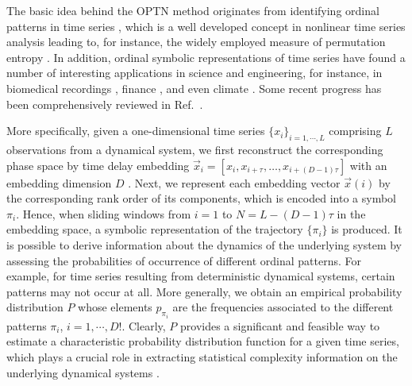 \documentclass[12pt,aip,cha,reprint,nofootinbib]{revtex4-1}
\begin{document}
The basic idea behind the OPTN method originates from identifying ordinal patterns in time series \cite{BandtPRL2002}, which is a well developed concept in nonlinear time series analysis leading to, for instance, the widely employed measure of permutation entropy \cite{BandtPRL2002}. In addition, ordinal symbolic representations of time series have found a number of interesting applications in science and engineering, for instance, in biomedical recordings \cite{AmigoPTRSA2014}, finance \cite{ZaninChaos2008}, and even climate \cite{BarreiroChaos2011}. Some recent progress has been comprehensively reviewed in Ref.~\cite{AmigoPTRSA2014}. 

More specifically, given a one-dimensional time series $\{ x_i\}_{i=1, \cdots, L}$ comprising $L$ observations from a dynamical system, we first reconstruct the corresponding phase space by time delay embedding $\vec{x}_i = [x_i, x_{i+\tau}, \ldots, x_{i+(D-1)\tau}]$ with an embedding dimension $D$ \cite{Takens1981,Kantz97}. Next, we represent each embedding vector $\vec{x}(i)$ by the corresponding rank order of its components, which is encoded into a symbol $\pi_{i}$. Hence, when sliding windows from $i=1$ to $N = L - (D - 1)\tau$ in the embedding space, a symbolic representation of the trajectory $\{\pi_i\}$ is produced. It is possible to derive information about the dynamics of the underlying system by assessing the probabilities of occurrence of different ordinal patterns. For example, for time series resulting from deterministic dynamical systems, certain patterns may not occur at all. More generally, we obtain an empirical probability distribution $P$ whose elements $p_{\pi_{i}}$ are the frequencies associated to the different patterns $\pi_{i}$, $i = 1, \cdots, D!$. Clearly, $P$ provides a significant and feasible way to estimate a characteristic probability distribution function for a given time series, which plays a crucial role in extracting statistical complexity information on the underlying dynamical systems \cite{BandtPRL2002,AmigoPTRSA2014}. 
\end{document}
